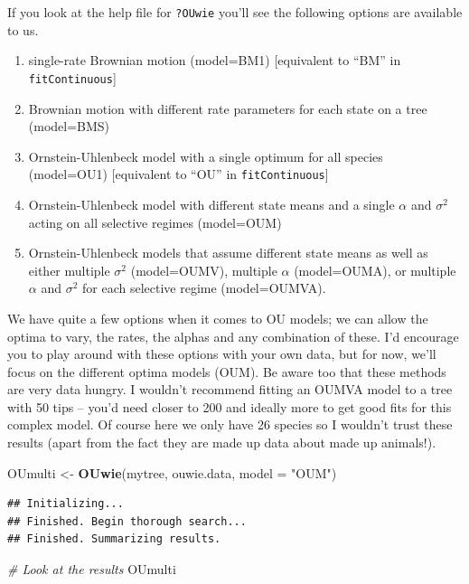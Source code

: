 \documentclass[]{book}
\newenvironment{Shaded}{\begin{snugshade}}{\end{snugshade}}
\newcommand{\KeywordTok}[1]{\textcolor[rgb]{0.13,0.29,0.53}{\textbf{{#1}}}}
\newcommand{\DataTypeTok}[1]{\textcolor[rgb]{0.13,0.29,0.53}{{#1}}}
\newcommand{\StringTok}[1]{\textcolor[rgb]{0.31,0.60,0.02}{{#1}}}
\newcommand{\CommentTok}[1]{\textcolor[rgb]{0.56,0.35,0.01}{\textit{{#1}}}}
\newcommand{\NormalTok}[1]{{#1}}
\providecommand{\tightlist}{%
  \setlength{\itemsep}{0pt}\setlength{\parskip}{0pt}}
\begin{document}
If you look at the help file for \texttt{?OUwie} you'll see the
following options are available to us.

\begin{enumerate}
\def\labelenumi{\arabic{enumi}.}
\tightlist
\item
  single-rate Brownian motion (model=BM1) {[}equivalent to ``BM'' in
  \texttt{fitContinuous}{]}
\item
  Brownian motion with different rate parameters for each state on a
  tree (model=BMS)
\item
  Ornstein-Uhlenbeck model with a single optimum for all species
  (model=OU1) {[}equivalent to ``OU'' in \texttt{fitContinuous}{]}
\item
  Ornstein-Uhlenbeck model with different state means and a single
  \(\alpha\) and \(\sigma^2\) acting on all selective regimes
  (model=OUM)
\item
  Ornstein-Uhlenbeck models that assume different state means as well as
  either multiple \(\sigma^2\) (model=OUMV), multiple \(\alpha\)
  (model=OUMA), or multiple \(\alpha\) and \(\sigma^2\) for each
  selective regime (model=OUMVA).
\end{enumerate}

We have quite a few options when it comes to OU models; we can allow the
optima to vary, the rates, the alphas and any combination of these. I'd
encourage you to play around with these options with your own data, but
for now, we'll focus on the different optima models (OUM). Be aware too
that these methods are very data hungry. I wouldn't recommend fitting an
OUMVA model to a tree with 50 tips -- you'd need closer to 200 and
ideally more to get good fits for this complex model. Of course here we
only have 26 species so I wouldn't trust these results (apart from the
fact they are made up data about made up animals!).

\begin{Shaded}
\begin{Highlighting}[]
\NormalTok{OUmulti <-}\StringTok{ }\KeywordTok{OUwie}\NormalTok{(mytree, ouwie.data, }\DataTypeTok{model =} \StringTok{"OUM"}\NormalTok{)}
\end{Highlighting}
\end{Shaded}

\begin{verbatim}
## Initializing... 
## Finished. Begin thorough search... 
## Finished. Summarizing results.
\end{verbatim}

\begin{Shaded}
\begin{Highlighting}[]
\CommentTok{# Look at the results}
\NormalTok{OUmulti}
\end{Highlighting}
\end{Shaded}
\end{document}
